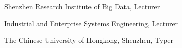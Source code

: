 

\tableofcontents






 \begin{contributors}
  Shenzhen Research Institute of Big Data, Lecturer

  Industrial and Enterprise Systems Engineering, Lecturer

  The Chinese University of Hongkong, Shenzhen, Typer
 \end{contributors}


\begin{foreword}
\lipsum[1-2]
\end{foreword}


\begin{preface}
\lipsum[1-1]
\prefaceauthor{}
\end{preface}



\acknowledgments
\lipsum[1-2]

